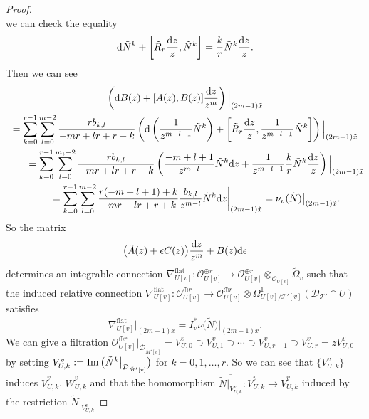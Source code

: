 \documentclass[pdftex]{sigma}
\numberwithin{equation}{section}
\newcommand\im{\mathop{\rm Im}\nolimits}
\begin{document}
\begin{proof}
\begin{equation*}
\end{equation*}
we can check the equality
\begin{equation} \label{equation: differential of k-th power of N}
 {\rm d}\tilde{N}^k+\left[\tilde{R}_r\frac{{\rm d}z}{z},\tilde{N}^k\right]
 =
 \frac{k}{r}\tilde{N}^k\frac{{\rm d}z}{z}.
\end{equation}
Then we can see
\begin{gather*}
 \left( {\rm d}B(z)+ [A(z),B(z)]\frac{{\rm d}z} {z^m} \right) \Big|_{(2m-1)\tilde{x}} \\
 =\sum_{k=0}^{r-1}\sum_{l=0}^{m-2}
 \frac{rb_{k,l}} {-mr+lr+r+k} \left( {\rm d} \left( \frac{1}{z^{m-l-1}} \tilde{N}^k \right)
 +\left[ \tilde{R}_r\frac{{\rm d}z}{z} , \frac{1}{z^{m-l-1}}\tilde{N}^k \right] \right)
 \Big|_{(2m-1)\tilde{x}}
 \\
\qquad{} =
 \sum_{k=0}^{r-1}\sum_{l=0}^{m_i-2}
 \frac{rb_{k,l}} {-mr+lr+r+k}
 \left( \frac{-m+l+1}{z^{m-l}}\tilde{N}^k {\rm d}z +\frac{1}{z^{m-l-1}}\frac{k}{r}\tilde{N}^k\frac{{\rm d}z}{z} \right)
 \Big|_{(2m-1)\tilde{x}}
 \\
\qquad{} =
 \sum_{k=0}^{r-1}\sum_{l=0}^{m-2}
 \frac { r(-m+l+1)+k } {-mr+lr+r+k} \frac { b_{k,l} } {z^{m-l}} \tilde{N}^k {\rm d}z
 \bigg|_{(2m-1)\tilde{x}}
 =
 \nu_v(\tilde{N}) \big|_{(2m-1)\tilde{x}}.
\end{gather*}
So the matrix
\[
 \big(\tilde{A}(z)+\epsilon C(z)\big) \frac{{\rm d}z} {z^m}
 +B(z) {\rm d}\epsilon
\]
determines an integrable connection
$\nabla^{\mathrm{flat}}_{U[v]} \colon
{\mathcal O}_{U[v]}^{\oplus r} \longrightarrow
{\mathcal O}_{U[v]}^{\oplus r}\otimes_{{\mathcal O}_{U[v]}} \tilde{\Omega}_v$
such that the induced relative connection
$\overline{\nabla^{\mathrm{flat}}_{U[v]}}
\colon {\mathcal O}_{U[v]}^{\oplus r} \longrightarrow
{\mathcal O}_{U[v]}^{\oplus r}\otimes
 \Omega^1_{U[v]/{\mathcal T'}[v]}({\mathcal D}_{\mathcal T'}\cap U)$
satisfies
\[
\overline{\nabla^{\mathrm{flat}}_{U[v]}}\big|_{(2m-1)\tilde{x}}
=I_v^*\nu\big(\tilde{N}\big)\big|_{(2m-1)\tilde{x}}.
\]
We can give a filtration
${\mathcal O}_{U[v]}^{\oplus r}\big|_{{\mathcal D}_{\tilde{M}'[v]}}
=V^v_{U,0}\supset V^v_{U,1}\supset\cdots\supset
V^v_{U,r-1}\supset V^v_{U,r}=z V^v_{U,0}$
by setting
$V^v_{U,k}:=\im \big(\tilde{N}^k\big|_{{\mathcal D}_{\tilde{M}'[v]}}\big)$
for $k=0,1,\dots,r$.
So we can see that
$\{ V^v_{U,k} \}$ induces
$\overline{V}^v_{U,k}$, $\overline{W}^v_{U,k}$
and that the homomorphism
$\overline{\tilde{N}|_{V^v_{U,k}}}\colon \overline{V}^v_{U,k}
\longrightarrow \overline{V}^v_{U,k}$
induced by the restriction $\tilde{N}|_{V^v_{U,k}}$

\end{proof}
\end{document}

